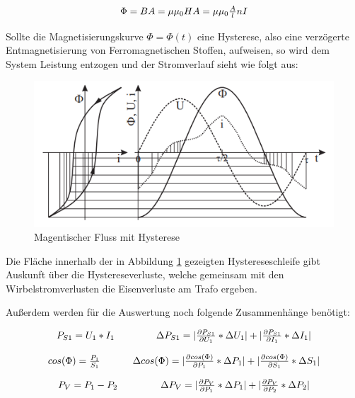 \documentclass[12pt,a4paper,twoside]{article}
\begin{document}
\begin{equation}
    \label{eq:Magnetischer Fluss}
    \centerline{$\Phi = BA = \mu \mu_{0} HA = \mu \mu_{0} \frac{A}{l} nI$}
\end{equation}

\noindent
Sollte die Magnetisierungskurve $\Phi = \Phi(t)$ eine Hysterese, also eine verzögerte Entmagnetisierung von Ferromagnetischen Stoffen, aufweisen, so wird dem System Leistung entzogen und der Stromverlauf sieht wie folgt aus:

\begin{figure}[H]
    \centering
    \includegraphics[width=0.5\linewidth]{nudes/GL-Hysterese.png}
    \caption{Magentischer Fluss mit Hysterese}
    \label{fig:Hystere}
\end{figure}

\noindent
Die Fläche innerhalb der in Abbildung \ref{fig:Hystere} gezeigten Hystereseschleife gibt Auskunft über die Hystereseverluste, welche gemeinsam mit den Wirbelstromverlusten die Eisenverluste am Trafo ergeben. \newline

\noindent
Außerdem werden für die Auswertung noch folgende Zusammenhänge benötigt:

\begin{equation}
    \label{eq:Scheinleistung}
    \centerline{$P_{S1} = U_{1}*I_{1}$ \\ $\Delta P_{S1} = \vert \frac{\partial P_{S1}}{\partial U_{1}} * \Delta U_{1} \vert + \vert \frac{\partial P_{S1}}{\partial I_{1}} * \Delta I_{1} \vert $}
\end{equation}

\begin{equation}
    \label{eq:Leistungsfaktor}
    \centerline{$cos(\Phi) = \frac{P_{1}}{S_{1}}$ \\ $\Delta cos(\Phi) = \vert \frac{\partial cos(\Phi)}{\partial P_{1}} * \Delta P_{1} \vert + \vert \frac{\partial cos(\Phi)}{\partial S_{1}} * \Delta S_{1} \vert $}
\end{equation}

\begin{equation}
    \label{eq:Verlustleistung}
    \centerline{$P_{V} = P_{1} - P_{2}$ \\ $\Delta P_{V} = \vert \frac{\partial P_{V}}{\partial P_{1}} * \Delta P_{1} \vert + \vert \frac{\partial P_{V}}{\partial P_{2}} * \Delta P_{2} \vert $}
\end{equation}
\end{document}
